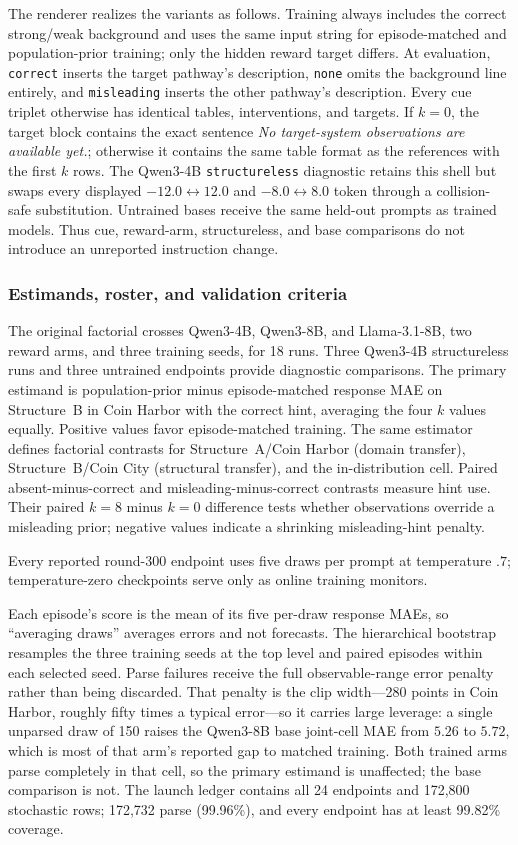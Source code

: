 The renderer realizes the variants as follows. Training always includes the
correct strong/weak background and uses the same input string for episode-matched and
population-prior training; only the hidden reward target differs. At evaluation,
\texttt{correct} inserts the target pathway's description, \texttt{none} omits
the background line entirely, and \texttt{misleading} inserts the other
pathway's description. Every cue triplet otherwise has identical tables,
interventions, and targets. If $k=0$, the target block contains the exact
sentence \emph{No target-system observations are available yet.}; otherwise it
contains the same table format as the references with the first $k$ rows. The
Qwen3-4B \texttt{structureless} diagnostic retains this shell but swaps every
displayed $-12.0\leftrightarrow12.0$ and $-8.0\leftrightarrow8.0$ token through
a collision-safe substitution. Untrained bases receive the same held-out
prompts as trained models. Thus cue, reward-arm, structureless, and base
comparisons do not introduce an unreported instruction change.

\subsubsection{Estimands, roster, and validation criteria}

The original factorial crosses Qwen3-4B, Qwen3-8B, and Llama-3.1-8B, two reward
arms, and three training seeds, for 18 runs. Three Qwen3-4B structureless runs
and three untrained endpoints provide diagnostic comparisons.
The primary estimand is population-prior minus episode-matched response MAE on
Structure~B in Coin Harbor with the correct hint, averaging the four $k$ values
equally. Positive values favor episode-matched training. The same estimator defines
factorial contrasts for Structure~A/Coin Harbor (domain transfer),
Structure~B/Coin City (structural transfer), and the in-distribution cell.
Paired absent-minus-correct and misleading-minus-correct contrasts measure hint
use. Their paired $k=8$ minus $k=0$ difference tests whether observations override
a misleading prior; negative values indicate a shrinking misleading-hint penalty.

Every reported round-300 endpoint uses five draws per prompt at temperature $.7$;
temperature-zero checkpoints serve only as online training monitors.

Each episode's score is the mean of its five per-draw response MAEs, so ``averaging
draws'' averages errors and not forecasts. The hierarchical bootstrap
resamples the three training seeds at the top level and paired episodes within
each selected seed. Parse failures receive the full observable-range error
penalty rather than being discarded. That penalty is the clip width---280 points
in Coin Harbor, roughly fifty times a typical error---so it carries large
leverage: a single unparsed draw of 150 raises the Qwen3-8B base joint-cell MAE
from $5.26$ to $5.72$, which is most of that arm's reported gap to matched
training. Both trained arms parse completely in that cell, so the primary
estimand is unaffected; the base comparison is not.
The launch ledger contains all 24 endpoints and 172,800 stochastic rows;
172,732 parse (99.96\%), and every endpoint has at least 99.82\% coverage.

